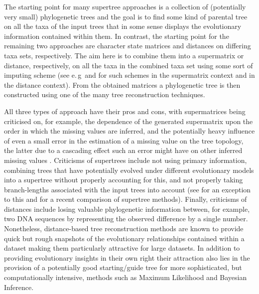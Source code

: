 The starting point for many supertree approaches is a collection of
(potentially very small) phylogenetic trees and the goal is to find some kind
of parental tree on all the taxa of the input trees that in some sense
displays the evolutionary information contained within them.  In contrast, the
starting point for the remaining two approaches are character state matrices
and distances on differing taxa sets, respectively. The aim here is to combine
them into a supermatrix or distance, respectively, on all the taxa in the
combined taxa set using some sort of imputing scheme (see
e.\,g\,\cite{bininda04phylogenetic} and \cite{queiroz06supermatrix} for such
schemes in the supermatrix context and
\cite{guenoche1999approximations,makarenkov2001nouvelle,guenoche2004extension}
in the distance context).  From the obtained matrices a phylogenetic tree is
then constructed using one of the many tree reconstruction techniques.

All three types of approach have their pros and cons, with supermatrices being
criticised on, for example, the dependence of the generated supermatrix upon
the order in which the missing values are inferred, and the potentially heavy
influence of even a small error in the estimation of a missing value on the
tree topology, the latter due to a cascading effect such an error might have
on other inferred missing values \cite{lapointe04everything}.  Criticisms of
supertrees include not using primary information, combining trees that have
potentially evolved under different evolutionary models into a supertree
without properly accounting for this, and not properly taking branch-lengths
associated with the input trees into account (see \cite{willson04constructing}
for an exception to this and \cite{kupczok11consequences} for a recent
comparison of supertree methods).  Finally, criticisms of distances include
losing valuable phylogenetic information between, for example, two DNA
sequences by representing the observed difference by a single number.
Nonetheless, distance-based tree reconstruction methods are known to provide
quick but rough snapshots of the evolutionary relationships contained within a
dataset making them particularly attractive for large datasets. In addition to
providing evolutionary insights in their own right their attraction also lies
in the provision of a potentially good starting/guide tree for more
sophisticated, but computationally intensive, methods such as Maximum
Likelihood and Bayesian Inference.

